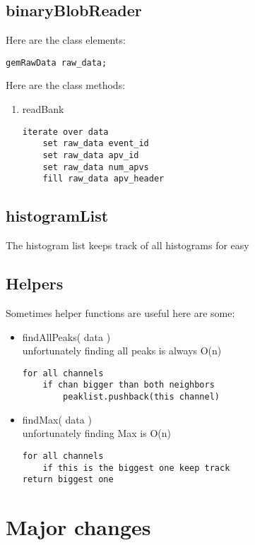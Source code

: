 \documentclass[11pt]{article}
\begin{document}
	
\subsection{binaryBlobReader}

Here are the class elements:

\begin{lstlisting}
gemRawData raw_data;
\end{lstlisting}


Here are the class methods:
	\begin{enumerate}
	
		\item readBank
		\begin{lstlisting}
iterate over data
	set raw_data event_id
	set raw_data apv_id
	set raw_data num_apvs
	fill raw_data apv_header
		\end{lstlisting}
	
	\end{enumerate}


\subsection{histogramList}
The histogram list keeps track of all histograms for easy 

\subsection{Helpers}
Sometimes helper functions are useful here are some:

	\begin{itemize}
		\item findAllPeaks( data )\\
		unfortunately finding all peaks is always O(n) 
		\begin{lstlisting}
for all channels
	if chan bigger than both neighbors
		peaklist.pushback(this channel)
		\end{lstlisting}
		
		\item findMax( data )\\
		unfortunately finding Max is O(n)
		\begin{lstlisting}
for all channels
	if this is the biggest one keep track
return biggest one
		\end{lstlisting}
	\end{itemize}

\section{Major changes}
\end{document}
